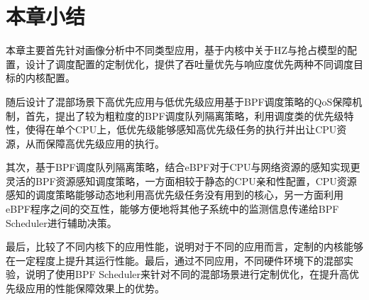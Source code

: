 
\section{本章小结}

本章主要首先针对画像分析中不同类型应用，基于内核中关于HZ与抢占模型的配置，设计了调度配置的定制优化，提供了吞吐量优先与响应度优先两种不同调度目标的内核配置。

随后设计了混部场景下高优先应用与低优先级应用基于BPF调度策略的QoS保障机制，首先，提出了较为粗粒度的BPF调度队列隔离策略，利用调度类的优先级特性，使得在单个CPU上，低优先级能够感知高优先级任务的执行并出让CPU资源，从而保障高优先级应用的执行。

其次，基于BPF调度队列隔离策略，结合eBPF对于CPU与网络资源的感知实现更灵活的BPF资源感知调度策略，一方面相较于静态的CPU亲和性配置，CPU资源感知的调度策略能够动态地利用高优先级任务没有用到的核心，另一方面利用eBPF程序之间的交互性，能够方便地将其他子系统中的监测信息传递给BPF Scheduler进行辅助决策。

最后，比较了不同内核下的应用性能，说明对于不同的应用而言，定制的内核能够在一定程度上提升其运行性能。最后，通过不同应用，不同硬件环境下的混部实验，说明了使用BPF Scheduler来针对不同的混部场景进行定制优化，在提升高优先级应用的性能保障效果上的优势。